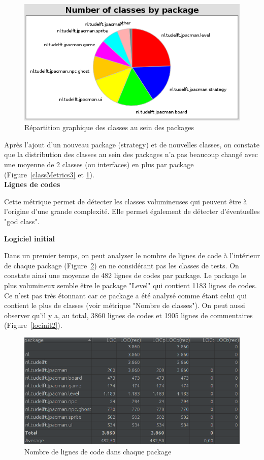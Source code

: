 \documentclass[12pt, openany]{report}
\begin{document}
\begin{figure}[!h]
	\centering
	\includegraphics[scale=0.7]{Images/classMetrics4.png} 
	\caption{Répartition graphique des classes au sein des packages}
	\label{classMetrics4}
\end{figure}
\newpage
Après l'ajout d'un nouveau package (strategy) et de nouvelles classes, on constate que la distribution des classes au sein des packages n'a pas beaucoup changé avec une moyenne de 2 classes (ou interfaces) en plus par package (Figure~\ref{classMetrics3} et \ref{classMetrics4}).\\


\textbf{Lignes de codes}


Cette métrique permet de détecter les classes volumineuses qui peuvent être à l'origine d'une grande complexité. Elle permet également de détecter d'éventuelles "god class".

\textbf{Logiciel initial}

Dans un premier temps, on peut analyser le nombre de lignes de code à l'intérieur de chaque package (Figure~\ref{locinit}) en ne considérant pas les classes de tests. On constate ainsi une moyenne de 482 lignes de codes par package. Le package le plus volumineux semble être le package "Level" qui contient 1183 lignes de codes. Ce n'est pas très étonnant car ce package a été analysé comme étant celui qui contient le plus de classes (voir métrique "Nombre de classes"). On peut aussi observer qu'il y a, au total, 3860 lignes de codes et 1905 lignes de commentaires (Figure~\ref{locinit2}).

\begin{figure}[!h]
	\centering
	\includegraphics[scale=0.6]{Images/SizeMetricsLOC.png} 
	\caption{Nombre de lignes de code dans chaque package}
	\label{locinit}
\end{figure}
\end{document}
